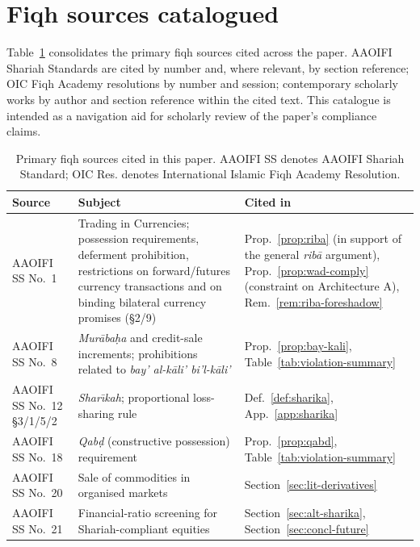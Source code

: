 \documentclass[preprint,12pt,authoryear]{elsarticle}
\theoremstyle{definition}
\begin{document}
\section{Fiqh sources catalogued}
\label{app:fiqh-sources}

Table~\ref{tab:fiqh-catalogue} consolidates the primary fiqh
sources cited across the paper. AAOIFI Shariah Standards
are cited by number and, where relevant, by section reference;
OIC Fiqh Academy resolutions by number and session; contemporary
scholarly works by author and section reference within the cited
text. This catalogue is intended as a navigation aid for
scholarly review of the paper's compliance claims.

\begin{table}[!p]
\centering
\scriptsize
\setlength{\tabcolsep}{4pt}
\renewcommand{\arraystretch}{1.05}
\caption{Primary fiqh sources cited in this paper. AAOIFI SS
denotes AAOIFI Shariah Standard; OIC Res. denotes International
Islamic Fiqh Academy Resolution.}
\label{tab:fiqh-catalogue}
\begin{tabular}{@{}p{4.3cm}p{4.3cm}p{4.3cm}@{}}
\toprule
\textbf{Source} & \textbf{Subject} & \textbf{Cited in} \\
\midrule
AAOIFI SS No.~1
    & Trading in Currencies; possession requirements, deferment
      prohibition, restrictions on forward/futures currency
      transactions and on binding bilateral currency promises
      (\S2/9)
    & Prop.~\ref{prop:riba} (in support of the general \emph{rib\={a}}
      argument), Prop.~\ref{prop:wad-comply} (constraint on
      Architecture A), Rem.~\ref{rem:riba-foreshadow} \\
AAOIFI SS No.~8
    & \emph{Mur\={a}ba\d{h}a} and credit-sale increments;
      prohibitions related to \emph{bay' al-k\={a}li' bi'l-k\={a}li'}
    & Prop.~\ref{prop:bay-kali},
      Table~\ref{tab:violation-summary} \\
AAOIFI SS No.~12 \S3/1/5/2
    & \emph{Shar\={\i}kah}; proportional loss-sharing rule
    & Def.~\ref{def:sharika}, App.~\ref{app:sharika} \\
AAOIFI SS No.~18
    & \emph{Qab\d{d}} (constructive possession) requirement
    & Prop.~\ref{prop:qabd},
      Table~\ref{tab:violation-summary} \\
AAOIFI SS No.~20
    & Sale of commodities in organised markets
    & Section~\ref{sec:lit-derivatives} \\
AAOIFI SS No.~21
    & Financial-ratio screening for Shariah-compliant equities
    & Section~\ref{sec:alt-sharika}, Section~\ref{sec:concl-future} \\

\end{tabular}
\end{table}
\end{document}
